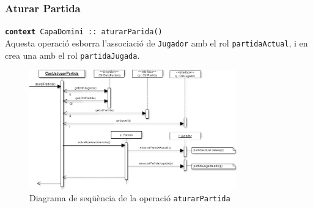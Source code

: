 \subsubsection{Aturar Partida}
\texttt{\textbf{context} CapaDomini :: aturarParida()}\\
Aquesta operació esborra l'associació de \texttt{Jugador} amb el rol \texttt{partidaActual}, i en crea una amb el rol \texttt{partidaJugada}.\\

    \begin{figure}[h]
    \centering
    \includegraphics[width=0.8\textwidth]{figures/aturarPartida.png}
     \caption{Diagrama de seqüència de la operació \texttt{aturarPartida}}
    \end{figure}
